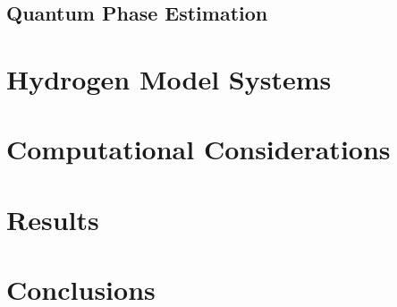 \documentclass[aip,jcp,amsmath,amssymb, reprint]{revtex4-1}
\begin{document}
\subsection{Quantum Phase Estimation}




\section{Hydrogen Model Systems}




\section{Computational Considerations}

\section{Results}

\section{Conclusions}


\end{document}
